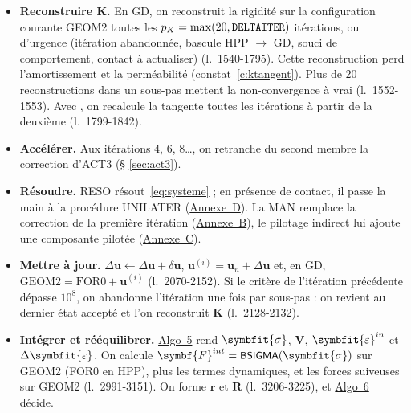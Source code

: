 \documentclass[11pt,a4paper]{article}
\numberwithin{equation}{section}
\newcommand{\src}[1]{\texttt{\detokenize{#1}}}          %
\newcommand{\pr}[1]{\textsf{#1}}                        %
\newcommand{\op}[1]{\textsf{\small #1}}                 %
\newcommand{\lig}[1]{l.~#1}
\newcommand{\vc}[1]{\symbf{#1}}                         %
\newcommand{\eps}{\varepsilon}
\newcommand{\Deps}{\Delta\symbfit{\varepsilon}}
\newcommand{\sig}{\symbfit{\sigma}}
\newcommand{\vg}[1]{\symbfit{#1}}                       %
\newcommand{\algoref}[1]{\hyperref[algo:#1]{Algo~#1}}
\newcommand{\annref}[1]{\hyperref[annexe:#1]{Annexe~#1}}
\begin{document}
\begin{itemize}
\item \textbf{Reconstruire $\vc K$.} En GD, on reconstruit la rigidité sur la configuration courante GEOM2 toutes les $p_K = \max(20, \src{DELTAITER})$ itérations, ou d'urgence (itération abandonnée, bascule HPP $\to$ GD, souci de comportement, contact à actualiser) (\lig{1540-1795}). Cette reconstruction perd l'amortissement et la perméabilité (constat~\ref{c:ktangent}). Plus de 20 reconstructions dans un sous-pas mettent la non-convergence à vrai (\lig{1552-1553}). Avec \src{K_TANGENT}, on recalcule la tangente toutes les \src{NITER_KTANGENT} itérations à partir de la deuxième (\lig{1799-1842}).
\item \textbf{Accélérer.} Aux itérations 4, 6, 8…, on retranche du second membre la correction d'\op{ACT3} (§ \ref{sec:act3}).
\item \textbf{Résoudre.} \op{RESO} résout~\eqref{eq:systeme} ; en présence de contact, il passe la main à la procédure \pr{UNILATER} (\annref{D}). La MAN remplace la correction de la première itération (\annref{B}), le pilotage indirect lui ajoute une composante pilotée (\annref{C}).
\item \textbf{Mettre à jour.} $\Delta\vc u \gets \Delta\vc u + \delta\vc u$, $\vc u^{(i)} = \vc u_n + \Delta\vc u$ et, en GD, $\mathrm{GEOM2} = \mathrm{FOR0} + \vc u^{(i)}$ (\lig{2070-2152}). Si le critère de l'itération précédente dépasse $10^{8}$, on abandonne l'itération une fois par sous-pas : on revient au dernier état accepté et l'on reconstruit $\vc K$ (\lig{2128-2132}).
\item \textbf{Intégrer et rééquilibrer.} \algoref{5} rend $\sig$, $\vc V$, $\vg\eps^{in}$ et $\Deps$. On calcule $\vc F^{int} = \op{BSIGMA}(\sig)$ sur GEOM2 (FOR0 en HPP), plus les termes dynamiques, et les forces suiveuses sur GEOM2 (\lig{2991-3151}). On forme $\vc r$ et $\vc R$ (\lig{3206-3225}), et \algoref{6} décide.
\end{itemize}
\end{document}
